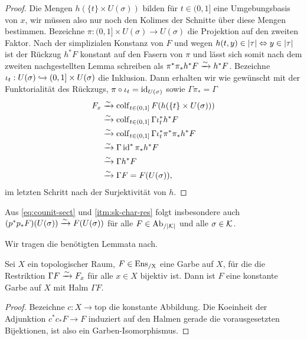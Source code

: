 \begin{proof}
  Die Mengen $h(\{t\} \times U(\sigma))$ bilden für $t \in (0, 1]$
    eine Umgebungsbasis von $x$, wir müssen also nur noch den Kolimes
    der Schnitte über diese Mengen bestimmen. Bezeichne $\pi: (0, 1]
      \times U(\sigma) \to U(\sigma)$ die Projektion auf den zweiten
      Faktor. Nach der simplizialen Konstanz von $F$ und wegen $h(t,
      y) \in |\tau| \Leftrightarrow y \in |\tau|$ ist der Rückzug $h^* F$
      konstant auf den Fasern von $\pi$ und lässt sich somit nach dem
      zweiten nachgestellten Lemma schreiben als $\pi^* \pi_* h^* F
      \xrightarrow{\sim} h^* F$. Bezeichne $\iota_t: U(\sigma) \xhookrightarrow{}
      (0, 1] \times U(\sigma)$ die Inklusion. Dann erhalten wir wie
        gewünscht mit der Funktorialität des Rückzugs, $\pi \circ
        \iota_t = \operatorname{id}_{U(\sigma)}$ sowie $\Gamma \pi_* = \Gamma$
   \begin{align*}
     F_x &\xrightarrow{\sim} \operatorname{colf}\limits_{t \in (0, 1]} F(h(\{t\} \times U(\sigma))) \\
         &\xrightarrow{\sim} \operatorname{colf}\limits_{t \in (0, 1]} \Gamma \iota_t^* h^* F \\
         &\xrightarrow{\sim} \operatorname{colf}\limits_{t \in (0, 1]} \Gamma \iota_t^* \pi^* \pi_* h^* F \\
         &\xrightarrow{\sim} \Gamma \operatorname{id}^* \pi_* h^* F \\
         &\xrightarrow{\sim} \Gamma h^* F \\
         &\xrightarrow{\sim} \Gamma F = F(U(\sigma)),
   \end{align*}
   im letzten Schritt nach der Surjektivität von $h$.
\end{proof}
\begin{bem} \label{beta-sect}
  Aus \autoref{eq:counit-sect} und \ref{itm:sk-char-res} folgt
  insbesondere auch $(p^* p_* F)(U(\sigma)) \xrightarrow{\sim} F(U(\sigma))$ für
  alle $F \in \operatorname{Ab}_{/|\mathcal{K}|}$ und alle $\sigma \in \mathcal{K}$.
\end{bem}

Wir tragen die benötigten Lemmata nach.

\begin{lemma}[\cite{TG}, 2.1.41]
  Sei $X$ ein topologischer Raum, $F \in \operatorname{Ens_{/X}}$ eine Garbe auf $X$,
  für die die Restriktion $\Gamma F \xrightarrow{\sim} F_x$ für alle $x \in X$
  bijektiv ist. Dann ist $F$ eine konstante Garbe auf $X$ mit Halm
  $\Gamma F$.
\end{lemma}
\begin{proof}
  Bezeichne $c: X \to \mathrm{top}$ die konstante Abbildung. Die
  Koeinheit der Adjunktion $c^* c_* F \to F$ induziert auf den Halmen
  gerade die vorausgesetzten Bijektionen, ist also ein
  Garben-Isomorphismus.
\end{proof}

